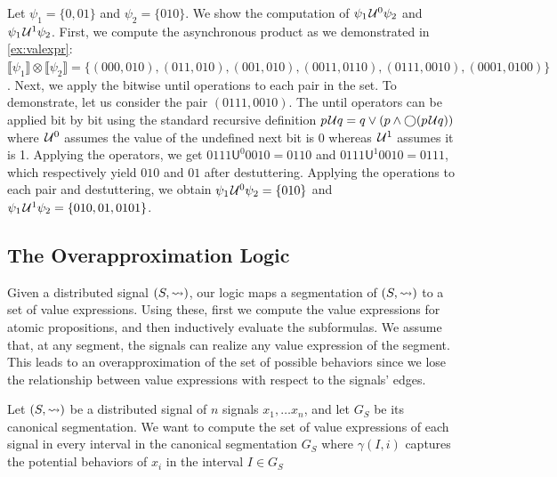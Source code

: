 \begin{example}
	Let $\psi_1 = \{ 0, 01 \}$ and $\psi_2 = \{ 010 \}$.
	We show the computation of $\psi_1 \kern.1em\mathcal{U}^0 \psi_2$ and $\psi_1 \kern.1em\mathcal{U}^1 \psi_2$.
	First, we compute the asynchronous product as we demonstrated in \cref{ex:valexpr}: $\llbracket \psi_1 \rrbracket \otimes \llbracket \psi_2 \rrbracket = \{ (000,010), (011,010), (001,010), (0011,0110), (0111,0010), (0001,0100)\}$.
	Next, we apply the bitwise until operations to each pair in the set.
	To demonstrate, let us consider the pair $(0111,0010)$.
	The until operators can be applied bit by bit using the standard recursive definition $p \kern.1em\mathcal{U} q = q \lor (p \land \bigcirc (p \kern.1em\mathcal{U} q))$ where $\kern.1em\mathcal{U}^0$ assumes the value of the undefined next bit is 0 whereas $\kern.1em\mathcal{U}^1$ assumes it is 1.
	Applying the operators, we get $0111 \mathsf{U}^0 0010 = 0110$ and $0111 \mathsf{U}^1 0010 = 0111$, which respectively yield $010$ and $01$ after destuttering.
	Applying the operations to each pair and destuttering, we obtain $\psi_1 \kern.1em\mathcal{U}^0 \psi_2 = \{ 010 \}$ and $\psi_1 \kern.1em\mathcal{U}^1 \psi_2 = \{ 010, 01, 0101\}$.
\end{example}

\subsection{The Overapproximation Logic}
Given a distributed signal $(S,{\rightsquigarrow})$, our logic maps a segmentation of $(S,{\rightsquigarrow})$ to a set of value expressions.
Using these, first we compute the value expressions for atomic propositions, and then inductively evaluate the subformulas.
We assume that, at any segment, the signals can realize any value expression of the segment.
This leads to an overapproximation of the set of possible behaviors since we lose the relationship between value expressions with respect to the signals' edges.


Let $(S,{\rightsquigarrow})$ be a distributed signal of $n$ signals $x_1, \ldots x_n$, and let $G_S$ be its canonical segmentation. %
We want to compute the set of value expressions of each signal in every interval in the canonical segmentation $G_S$ where $\gamma(I, i)$ captures the potential behaviors of $x_i$ in the interval $I \in G_S$

